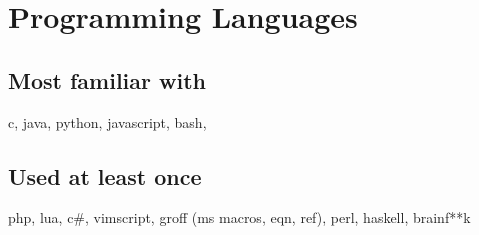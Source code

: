 \documentclass[9pt]{extarticle}
\begin{document}
    \section{Programming Languages}
    \subsection{Most familiar with}
    c, java, python, javascript, bash, \latex
    \subsection{Used at least once}
    php, lua, c\#, vimscript, groff (ms macros, eqn, ref), perl, haskell, brainf**k
\end{document}
